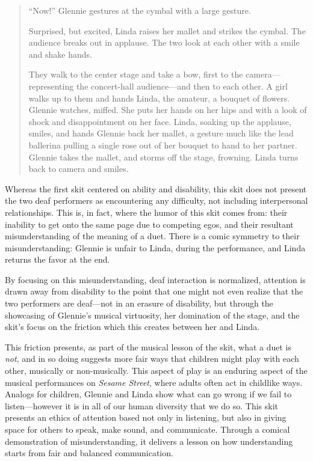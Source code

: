 \documentclass[12pt,letterpaper]{article}
\begin{document}
\begin{quote}
	``Now!'' Glennie gestures at the cymbal with a large gesture. 

	Surprised, but excited, Linda raises her mallet and strikes the cymbal. 
	The audience breaks out in applause. The two look at each other with a 
	smile and shake hands. 

	They walk to the center stage and take a bow, first to the camera---
	representing the concert-hall audience---and then to each other. A girl 
	walks up to them and hands Linda, the amateur, a bouquet of flowers. 
	Glennie watches, miffed. She puts her hands on her hips and with a look 
	of shock and disappointment on her face. Linda, soaking up the applause, 
	smiles, and hands Glennie back her mallet, a gesture much like the lead 
	ballerina pulling a single rose out of her bouquet to hand to her 
	partner. Glennie takes the mallet, and storms off the stage, frowning. 
	Linda turns back to camera and smiles.   
	
	\end{quote}

	Whereas the first skit centered on ability and disability, this skit 
	does not present the two deaf performers as encountering any difficulty,
	not including interpersonal relationships. This is, in fact, where the
	humor of this skit comes from: their inability to get onto the same
	page due to competing egos,
	and their resultant misunderstanding of the meaning of a duet. There is
	a comic symmetry to their misunderstanding: Glennie is unfair to Linda, 
	during the performance, and Linda returns the favor at the end. 

	By focusing on this misunderstanding, deaf interaction is normalized,
	attention is drawn away from disability to the point that one might not
	even realize that the two performers are deaf---not in an erasure of 
	disability, but through the showcasing of Glennie's musical virtuosity,
	her domination of the stage, and the skit's focus on the friction
	which this creates between her and Linda.  

	This friction presents, as part of the musical lesson of the skit, 
	what a duet is \textit{not}, and in so doing suggests more fair ways
	that children might play with each other, musically or non-musically.
	This aspect of play is an enduring aspect of the musical performances
	on \textit{Sesame Street}, where adults often act in childlike ways.
	Analogs for children, Glennie and Linda show what can go wrong if we
	fail to listen---however it is in all of our human diversity that we
	do so. This skit presents an ethics of attention based not only in
	listening, but also in giving space for others to speak, make sound,
	and communicate. Through a comical demonstration of misunderstanding, 
	it delivers a lesson on how understanding starts from fair and balanced
	communication.	
\end{document}
